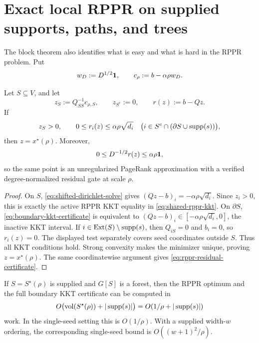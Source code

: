 \section{Exact local RPPR on supplied supports, paths, and trees}
\label{sec:rppr-terminal}

The block theorem also identifies what is easy and what is hard in the RPPR
problem.  Put
\begin{equation}
 w_D:=D^{1/2}\mathbf{1},
 \qquad
 c_\rho:=b-\alpha\rho w_D.
 \label{eq:shifted-rppr-demand}
\end{equation}

\begin{theorem}
\label{thm:shifted-dirichlet}
Let $S\subseteq V$, and let
\begin{equation}
 z_S:=Q_{SS}^{-1}c_{\rho,S},
 \qquad z_{S^c}:=0,
 \qquad r(z):=b-Qz.
 \label{eq:shifted-dirichlet-solve}
\end{equation}
If
\begin{equation}
 z_S>0,
 \qquad
 0\leq r_i(z)\leq\alpha\rho\sqrt{d_i}
 \quad\bigl(i\in S^c\cap(\partial S\cup\operatorname{supp}(s))\bigr),
 \label{eq:boundary-kkt-certificate}
\end{equation}
then $z=x^\star(\rho)$.  Moreover,
\begin{equation}
 0\leq D^{-1/2}r(z)\leq\alpha\rho\mathbf{1},
 \label{eq:rppr-residual-certificate}
\end{equation}
so the same point is an unregularized PageRank approximation with a verified
degree-normalized residual gate at scale $\rho$.
\end{theorem}

\begin{proof}
On $S$, \cref{eq:shifted-dirichlet-solve} gives
$(Qz-b)_i=-\alpha\rho\sqrt{d_i}$.  Since $z_i>0$, this is exactly the active
RPPR KKT equality in \cref{eq:shared-rppr-kkt}.  On $\partial S$,
\cref{eq:boundary-kkt-certificate} is equivalent to
$(Qz-b)_i\in[-\alpha\rho\sqrt{d_i},0]$, the inactive KKT interval.  If
$i\in\operatorname{Ext}(S)\setminus\operatorname{supp}(s)$, then $Q_{iS}=0$ and $b_i=0$,
so $r_i(z)=0$.  The displayed test separately covers seed coordinates outside
$S$.  Thus all KKT conditions hold.  Strong convexity makes the minimizer
unique, proving $z=x^\star(\rho)$.  The same coordinatewise argument gives
\cref{eq:rppr-residual-certificate}.
\end{proof}

\begin{corollary}
\label{cor:forest-rppr-terminal}
If $S=S^\star(\rho)$ is supplied and $G[S]$ is a forest, then the RPPR optimum
and the full boundary KKT certificate can be computed in
\begin{equation}
 O\bigl(\operatorname{vol}(S^\star(\rho))+|\operatorname{supp}(s)|\bigr)
 =O(1/\rho+|\operatorname{supp}(s)|)
 \label{eq:forest-rppr-terminal-work}
\end{equation}
work.  In the single-seed setting this is $O(1/\rho)$.  With a supplied
width-$w$ ordering, the corresponding single-seed bound is
$O((w+1)^2/\rho)$.
\end{corollary}

